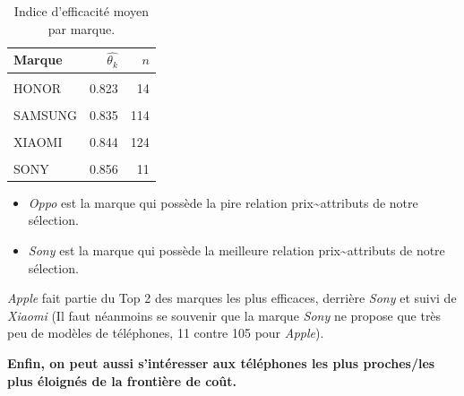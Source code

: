\documentclass[
  12pt,
]{report}
\providecommand{\tightlist}{%
  \setlength{\itemsep}{0pt}\setlength{\parskip}{0pt}}\usepackage{longtable,booktabs,array}
\begin{document}
\begin{table}[!h]
\centering
\caption{\label{tab:eff_brands}Indice d'efficacité moyen par marque.}
\centering
\begin{tabular}[t]{lrr}
\toprule
\textbf{Marque} & \textbf{$\hat{\theta_k}$} & \textbf{$n$}\\
\midrule
\cellcolor{gray!10}{OPPO} & \cellcolor{gray!10}{0.817} & \cellcolor{gray!10}{6}\\
HONOR & 0.823 & 14\\
\cellcolor{gray!10}{MOTOROLA} & \cellcolor{gray!10}{0.824} & \cellcolor{gray!10}{36}\\
SAMSUNG & 0.835 & 114\\
\cellcolor{gray!10}{GOOGLE} & \cellcolor{gray!10}{0.842} & \cellcolor{gray!10}{23}\\
\addlinespace
XIAOMI & 0.844 & 124\\
\cellcolor{gray!10}{APPLE} & \cellcolor{gray!10}{0.848} & \cellcolor{gray!10}{104}\\
SONY & 0.856 & 11\\
\bottomrule
\end{tabular}
\end{table}

\newpage

\begin{itemize}
\tightlist
\item
  \emph{Oppo} est la marque qui possède la pire relation
  prix\textasciitilde attributs de notre sélection.
\item
  \emph{Sony} est la marque qui possède la meilleure relation
  prix\textasciitilde attributs de notre sélection.
\end{itemize}

\emph{Apple} fait partie du Top 2 des marques les plus efficaces,
derrière \emph{Sony} et suivi de \emph{Xiaomi} (Il faut néanmoins se
souvenir que la marque \emph{Sony} ne propose que très peu de modèles de
téléphones, 11 contre 105 pour \emph{Apple}).

\textbf{Enfin, on peut aussi s'intéresser aux téléphones les plus
proches/les plus éloignés de la frontière de coût.}
\end{document}
